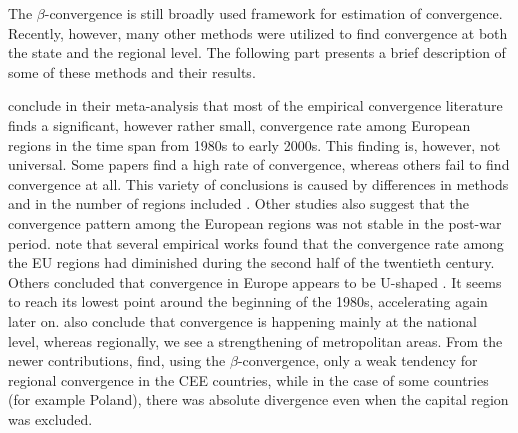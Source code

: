 \documentclass[11pt]{article}
\begin{document}
The $\beta$-convergence is still broadly used framework for estimation of convergence. Recently, however, many other methods were utilized to find convergence at both the state and the regional level. The following part presents a brief description of some of these methods and their results.
  

\citet{eckey2007convergence} conclude in their meta-analysis that most of the empirical convergence literature finds a significant, however rather small, convergence rate among European regions in the time span from 1980s to early 2000s. This finding is, however, not universal. Some papers find a high rate of convergence, whereas others fail to find convergence at all. This variety of conclusions is caused by differences in methods and in the number of regions included \citep{eckey2007convergence}. Other studies also suggest that the convergence pattern among the European regions was not stable in the post-war period. \citet{eckey2007convergence} note that several empirical works found that the convergence rate among the EU regions had diminished during the second half of the twentieth century. Others concluded that convergence in Europe appears to be U-shaped \citep{basile2001regional, geppert2008regional}. It seems to reach its lowest point around the beginning of the 1980s, accelerating again later on. \citet{geppert2008regional} also conclude that convergence is happening mainly at the national level, whereas regionally, we see a strengthening of metropolitan areas. From the newer contributions, \citet*{sme2012regional} find, using the $\beta$-convergence, only a weak tendency for regional convergence in the CEE countries, while in the case of some countries (for example Poland), there was absolute divergence even when the capital region was excluded. %
 
\end{document}
